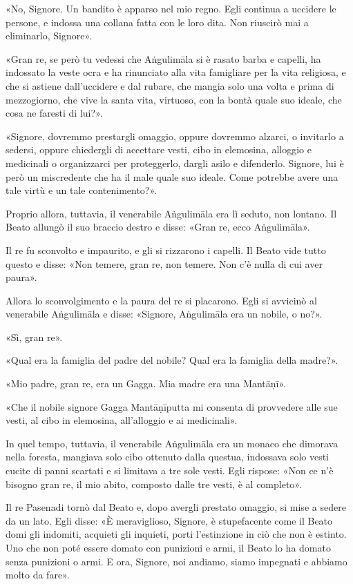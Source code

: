 «No, Signore. Un bandito è apparso nel mio regno. Egli continua a uccidere le
persone, e indossa una collana fatta con le loro dita. Non riuscirò mai a
eliminarlo, Signore».

«Gran re, se però tu vedessi che Aṅgulimāla si è rasato barba e capelli, ha
indossato la veste ocra e ha rinunciato alla vita famigliare per la vita
religiosa, e che si astiene dall’uccidere e dal rubare, che mangia solo una
volta e prima di mezzogiorno, che vive la santa vita, virtuoso, con la bontà
quale suo ideale, che cosa ne faresti di lui?».

«Signore, dovremmo prestargli omaggio, oppure dovremmo alzarci, o invitarlo a
sedersi, oppure chiedergli di accettare vesti, cibo in elemosina, alloggio e
medicinali o organizzarci per proteggerlo, dargli asilo e difenderlo. Signore,
lui è però un miscredente che ha il male quale suo ideale. Come potrebbe avere
una tale virtù e un tale contenimento?».

Proprio allora, tuttavia, il venerabile Aṅgulimāla era lì seduto, non lontano.
Il Beato allungò il suo braccio destro e disse: «Gran re, ecco Aṅgulimāla».

Il re fu sconvolto e impaurito, e gli si rizzarono i capelli. Il Beato vide
tutto questo e disse: «Non temere, gran re, non temere. Non c’è nulla di cui
aver paura».

Allora lo sconvolgimento e la paura del re si placarono. Egli si avvicinò al
venerabile Aṅgulimāla e disse: «Signore, Aṅgulimāla era un nobile, o no?».

«Sì, gran re».

«Qual era la famiglia del padre del nobile? Qual era la famiglia della madre?».

«Mio padre, gran re, era un Gagga. Mia madre era una Mantāṇī».

«Che il nobile signore Gagga Mantāṇīputta mi consenta di provvedere alle sue
vesti, al cibo in elemosina, all’alloggio e ai medicinali».

In quel tempo, tuttavia, il venerabile Aṅgulimāla era un monaco che dimorava
nella foresta, mangiava solo cibo ottenuto dalla questua, indossava solo vesti
cucite di panni scartati e si limitava a tre sole vesti. Egli rispose: «Non ce
n’è bisogno gran re, il mio abito, composto dalle tre vesti, è al completo».

Il re Pasenadi tornò dal Beato e, dopo avergli prestato omaggio, si mise a
sedere da un lato. Egli disse: «È meraviglioso, Signore, è stupefacente come il
Beato domi gli indomiti, acquieti gli inquieti, porti l’estinzione in ciò che
non è estinto. Uno che non poté essere domato con punizioni e armi, il Beato lo
ha domato senza punizioni o armi. E ora, Signore, noi andiamo, siamo impegnati e
abbiamo molto da fare».


